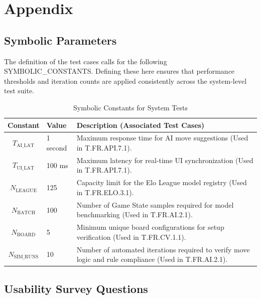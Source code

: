 \documentclass[12pt, titlepage]{article}
\begin{document}




\newpage

\section{Appendix}

\subsection{Symbolic Parameters}

The definition of the test cases calls for the following SYMBOLIC\_CONSTANTS. Defining these here ensures that performance thresholds and iteration counts are applied consistently across the system-level test suite.

\begin{table}[h!]
    \centering
    \caption{Symbolic Constants for System Tests}
    \label{tab:symbolic-parameters}
    \begin{tabularx}{\textwidth}{|c|p{2.5cm}|X|}
    \hline
    \textbf{Constant} & \textbf{Value} & \textbf{Description (Associated Test Cases)} \\
    \hline
    $T_{\text{AI\_LAT}}$ & 1 second & Maximum response time for AI move suggestions (Used in T.FR.API.7.1). \\
    \hline
    $T_{\text{UI\_LAT}}$ & 100 ms & Maximum latency for real-time UI synchronization (Used in T.FR.API.7.1). \\
    \hline
    $N_{\text{LEAGUE}}$ & 125 & Capacity limit for the Elo League model registry (Used in T.FR.ELO.3.1). \\
    \hline
    $N_{\text{BATCH}}$ & 100 & Number of Game State samples required for model benchmarking (Used in T.FR.AI.2.1). \\
    \hline
    $N_{\text{BOARD}}$ & 5 & Minimum unique board configurations for setup verification (Used in T.FR.CV.1.1). \\
    \hline
    $N_{\text{SIM\_RUNS}}$ & 10 & Number of automated iterations required to verify move logic and rule compliance (Used in T.FR.AI.2.1). \\
    \hline
    \end{tabularx}
\end{table}


\subsection{Usability Survey Questions}
\end{document}
